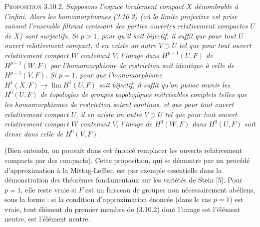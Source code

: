 \textsc{Proposition 3.10.2.} \textit{Supposons l'espace localement
compact $X$ dénombrable à l'infini. Alors les homomorphismes \textup{(3.10.2)} \textup{(}où la
limite projective est prise suivant l'ensemble filtrant croissant des parties
ouvertes relativement compactes $U$ de $X$\textup{)} sont surjectifs. Si $p>1$, pour
qu'il soit bijectif, il suffit que pour tout $U$ ouvert relativement compact,
il en existe un autre $V\supset U$ tel que pour tout ouvert relativement compact
$W$ contenant $V$, l'image dans $H^{p-1}(U,F)$ de $H^{p-1}(W,F)$ par
l'homomorphisme de restriction soit identique à celle de $H^{p-1}(V,F)$. Si
$p=1$, pour que l'homomorphisme
$H^1(X,F)\to\lim H^1(U,F)$ soit bijectif, il suffit qu'on
puisse munir les $H^0(U,F)$ de topologies de groupes topologiques métrisables
complets telles que les homomorphismes de restriction soient continus, et que
pour tout ouvert relativement compact $U$, il en existe un autre $V\supset U$
tel que pour tout ouvert relativement compact $W$ contenant $V$, l'image de
$H^0(W,F)$ dans $H^0(U,F)$ soit dense dans celle de $H^0(V,F)$.}

(Bien entendu, on pouvait dans cet énoncé remplacer les ouverts relativement
compacts par des compacts). Cette proposition, qui se démontre par un procédé
d'approximation à la Mittag-Leffler, est par exemple essentielle dans la
démonstration des théorèmes fondamentaux sur les variétés de Stein [5]. Pour
$p=1$, elle reste vraie si $F$ est un faisceau de groupes non nécessairement
abéliens, sous la forme : si la condition d'approximation énoncée (dans le cas
$p=1$) est vraie, tout élément du premier membre de (3.10.2) dont l'image est
l'élément neutre, est l'élément neutre.

